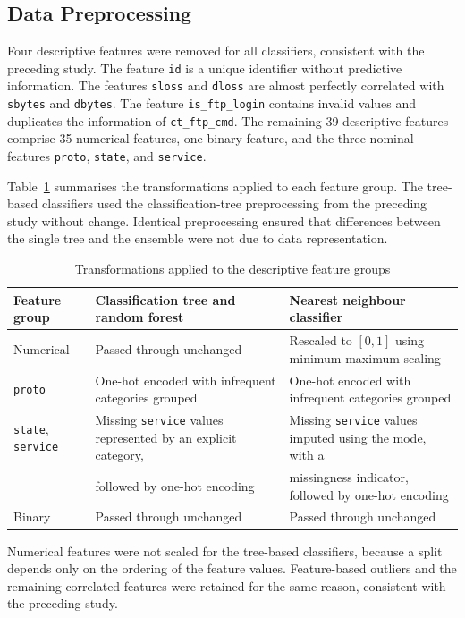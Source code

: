 \documentclass[conference]{IEEEtran}
\begin{document}
\subsection{Data Preprocessing}

Four descriptive features were removed for all classifiers, consistent with the preceding study. The feature \texttt{id} is a unique identifier without predictive information. The features \texttt{sloss} and \texttt{dloss} are almost perfectly correlated with \texttt{sbytes} and \texttt{dbytes}. The feature \texttt{is\_ftp\_login} contains invalid values and duplicates the information of \texttt{ct\_ftp\_cmd}. The remaining 39 descriptive features comprise 35 numerical features, one binary feature, and the three nominal features \texttt{proto}, \texttt{state}, and \texttt{service}.

Table~\ref{tab:preprocessing} summarises the transformations applied to each feature group. The tree-based classifiers used the classification-tree preprocessing from the preceding study without change. Identical preprocessing ensured that differences between the single tree and the ensemble were not due to data representation.

\begin{table}[!t]
\caption{Transformations applied to the descriptive feature groups}
\label{tab:preprocessing}
\centering
\begin{tabular}{@{}lll@{}}
\toprule
Feature group & Classification tree and random forest & Nearest neighbour classifier \\
\midrule
Numerical & Passed through unchanged & Rescaled to $[0,1]$ using minimum-maximum scaling \\
\texttt{proto} & One-hot encoded with infrequent categories grouped & One-hot encoded with infrequent categories grouped \\
\texttt{state}, \texttt{service} & Missing \texttt{service} values represented by an explicit category, & Missing \texttt{service} values imputed using the mode, with a \\
 & followed by one-hot encoding & missingness indicator, followed by one-hot encoding \\
Binary & Passed through unchanged & Passed through unchanged \\
\bottomrule
\end{tabular}
\end{table}

Numerical features were not scaled for the tree-based classifiers, because a split depends only on the ordering of the feature values. Feature-based outliers and the remaining correlated features were retained for the same reason, consistent with the preceding study.
\end{document}
